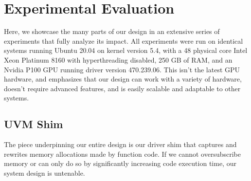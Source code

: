 \section{Experimental Evaluation}
\label{sec:eval}

Here, we showcase the many parts of our design in an extensive series of experiments that fully analyze its impact.
All experiments were run on identical systems running Ubuntu 20.04 on kernel version 5.4, with a 48 physical core Intel Xeon Platinum 8160 with hyperthreading disabled, 250 GB of RAM, and an Nvidia P100 GPU running driver version 470.239.06.
This isn't the latest GPU hardware, and emphasizes that our design can work with a variety of hardware, doesn't require advanced features, and is easily scalable and adaptable to other systems.

\subsection{UVM Shim}
\label{sec:shim}

The piece underpinning our entire design is our driver shim that captures and rewrites memory allocations made by function code.
If we cannot oversubscribe memory or can only do so by significantly increasing code execution time, our system design is untenable.

